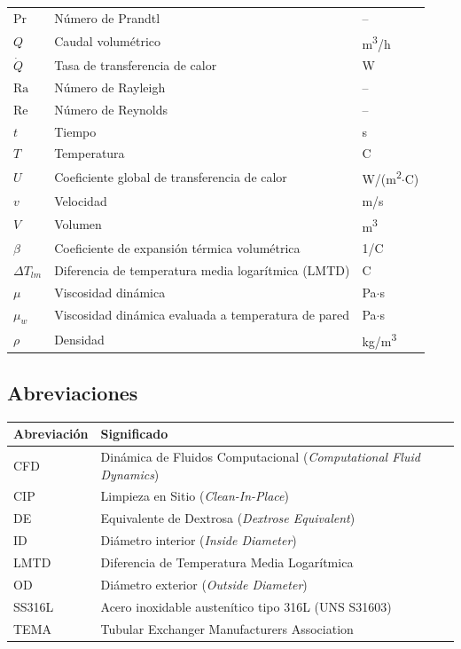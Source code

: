 \begin{tabularx}{\textwidth}{@{}lXl@{}}
	$\text{Pr}$ & N\'umero de Prandtl & -- \\
	$Q$ & Caudal volum\'etrico & m\textsuperscript{3}/h \\
	$\dot{Q}$ & Tasa de transferencia de calor & W \\
	$\text{Ra}$ & N\'umero de Rayleigh & -- \\
	$\text{Re}$ & N\'umero de Reynolds & -- \\
	$t$ & Tiempo & s \\
	$T$ & Temperatura & \textdegree C \\
	$U$ & Coeficiente global de transferencia de calor & W/(m\textsuperscript{2}$\cdot$\textdegree C) \\
	$v$ & Velocidad & m/s \\
	$V$ & Volumen & m\textsuperscript{3} \\
	\midrule
	$\beta$ & Coeficiente de expansi\'on t\'ermica volum\'etrica & 1/\textdegree C \\
	$\Delta T_{lm}$ & Diferencia de temperatura media logar\'itmica (LMTD) & \textdegree C \\
	$\mu$ & Viscosidad din\'amica & Pa$\cdot$s \\
	$\mu_w$ & Viscosidad din\'amica evaluada a temperatura de pared & Pa$\cdot$s \\
	$\rho$ & Densidad & kg/m\textsuperscript{3} \\
	\bottomrule
\end{tabularx}

\vspace{0.8cm}

\subsection*{Abreviaciones}
\begin{tabularx}{\textwidth}{@{}lX@{}}
	\toprule
	\textbf{Abreviaci\'on} & \textbf{Significado} \\
	\midrule
	CFD & Din\'amica de Fluidos Computacional (\textit{Computational Fluid Dynamics}) \\
	CIP & Limpieza en Sitio (\textit{Clean-In-Place}) \\
	DE & Equivalente de Dextrosa (\textit{Dextrose Equivalent}) \\
	ID & Di\'ametro interior (\textit{Inside Diameter}) \\
	LMTD & Diferencia de Temperatura Media Logar\'itmica \\
	OD & Di\'ametro exterior (\textit{Outside Diameter}) \\
	SS316L & Acero inoxidable austen\'itico tipo 316L (UNS S31603) \\
	TEMA & Tubular Exchanger Manufacturers Association \\
	\bottomrule
\end{tabularx}

\newpage

